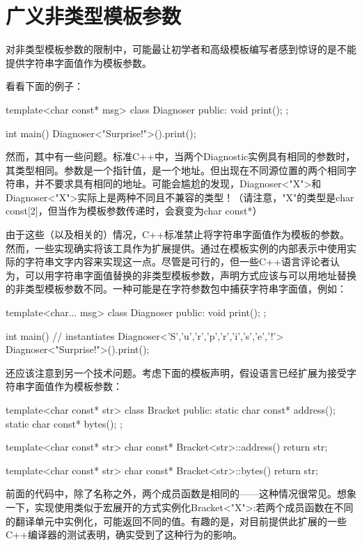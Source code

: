 \section{广义非类型模板参数}
对非类型模板参数的限制中，可能最让初学者和高级模板编写者感到惊讶的是不能提供字符串字面值作为模板参数。

看看下面的例子：

\begin{cpp}
template<char const* msg>
class Diagnoser {
	public:
	void print();
};

int main() {
	Diagnoser<"Surprise!">().print();
}
\end{cpp}

然而，其中有一些问题。标准C++中，当两个Diagnostic实例具有相同的参数时，其类型相同。参数是一个指针值，是一个地址。但出现在不同源位置的两个相同字符串，并不要求具有相同的地址。可能会尴尬的发现，Diagnoser<"X">和Diagnoser<"X">实际上是两种不同且不兼容的类型！（请注意，"X"的类型是char const[2]，但当作为模板参数传递时，会衰变为char const*）

由于这些（以及相关的）情况，C++标准禁止将字符串字面值作为模板的参数。然而，一些实现确实将该工具作为扩展提供。通过在模板实例的内部表示中使用实际的字符串文字内容来实现这一点。尽管是可行的，但一些C++语言评论者认为，可以用字符串字面值替换的非类型模板参数，声明方式应该与可以用地址替换的非类型模板参数不同。一种可能是在字符参数包中捕获字符串字面值，例如：

\begin{cpp}
template<char... msg>
class Diagnoser {
	public:
	void print();
};

int main() {
	// instantiates Diagnoser<'S','u','r','p','r','i','s','e','!'>
	Diagnoser<"Surprise!">().print();
}
\end{cpp}

还应该注意到另一个技术问题。考虑下面的模板声明，假设语言已经扩展为接受字符串字面值作为模板参数：

\begin{cpp}
template<char const* str>
class Bracket {
	public:
	static char const* address();
	static char const* bytes();
};

template<char const* str>
char const* Bracket<str>::address() {
	return str;
}

template<char const* str>
char const* Bracket<str>::bytes() {
	return str;
}
\end{cpp}

前面的代码中，除了名称之外，两个成员函数是相同的——这种情况很常见。想象一下，实现使用类似于宏展开的方式实例化Bracket<"X">:若两个成员函数在不同的翻译单元中实例化，可能返回不同的值。有趣的是，对目前提供此扩展的一些C++编译器的测试表明，确实受到了这种行为的影响。

